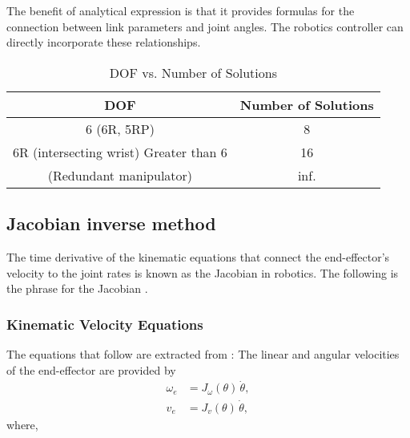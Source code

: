 \documentclass[12pt]{article}
\begin{document}
The benefit of analytical expression is that it provides formulas for the connection between link parameters and joint angles. The robotics controller can directly incorporate these relationships\cite{ref10}.\\

\begin{table}[h]
    \centering
    \begin{tabular}{cc}
        \toprule
        \textbf{DOF} & \textbf{Number of Solutions} \\
        \midrule
        6 (6R, 5RP) & 8 \\
        6R (intersecting wrist)
Greater than 6 & 16\\
        (Redundant manipulator) & inf.\\
        \bottomrule
    \end{tabular}
    \caption{DOF vs. Number of Solutions \cite{ref19}}
    \label{tab:dof_solutions}
\end{table}
\newpage
\subsection{Jacobian inverse method}
The time derivative of the kinematic equations that connect the end-effector's velocity to the joint rates is known as the Jacobian in robotics. The following is the phrase for the Jacobian \cite{ref19}.
\subsubsection{Kinematic Velocity Equations}

The equations that follow are extracted from \cite{ref19}:  The linear and angular velocities of the end-effector are provided by
\begin{align}
  \omega_e &= J_{\omega}(\theta)\,\dot{\theta}, \\
  v_e      &= J_{v}(\theta)\,\dot{\theta},
\end{align}
where,
\end{document}
